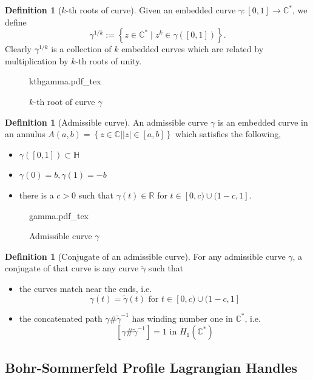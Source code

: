 \documentclass[11pt, oneside,dvipsnames]{amsart}
\newcommand{\incfig}[2]{
   
        \def\svgscale{#1}
    {#2.pdf_tex}
      
      
  
 }
\renewcommand{\to}{\rightarrow}
\newcommand{\sub}{\subset}
\newcommand{\inv}{^{-1}}
\newcommand{\wt}{\widetilde}
\renewcommand{\to}{\rightarrow}
\newcommand{\<}{\langle}
\renewcommand{\>}{\rangle}
\newcommand{\bC}{\mathbb{C}}
\newcommand{\bH}{\mathbb{H}}
\newcommand{\bR}{\mathbb{R}}
\renewcommand{\to}{\rightarrow}
\theoremstyle{definition}
\theoremstyle{definition}
\newtheorem{defn}[Theorem]{Definition}
\numberwithin{equation}{subsection}
\begin{document}
\begin{defn}[$k$-th roots of curve]
    Given an embedded curve $\gamma:[0,1] \to \bC^*$, we define $$\gamma^{1/k} := \left \{ z\in \bC^* \mid z^k \in \gamma([0,1]) \right\}. $$ Clearly $\gamma^{1/k}$ is a collection of $k$ embedded curves which are related by multiplication by $k$-th roots of unity. 
\end{defn}


\begin{figure}[ht]
    \centering
   \incfig{1}{kthgamma}
    \caption{$k$-th root of curve $\gamma$}
\end{figure}
\begin{defn}[Admissible curve]
    An admissible curve $\gamma$ is an embedded curve in an annulus $A(a,b) = \left \{ z \in \bC | |z|\in [a,b] \right \}$ which satisfies the following,
    \begin{itemize}
        \item $\gamma([0,1]) \sub \bH$
        \item $\gamma(0) = b, \gamma(1) = -b$
        \item there is a  $c > 0 $ such that  $\gamma(t) \in \bR$  for $t\in [0,c) \cup (1-c,1] .$
    \end{itemize}
    
\end{defn}


\begin{figure}[ht]
    \centering
   \incfig{1}{gamma}
    \caption{Admissible curve $\gamma$}
\end{figure}


\begin{defn}[Conjugate of an admissible curve]
For any admissible curve $\gamma$, a conjugate of that curve is any curve $\widetilde {\gamma} $ such that 
\begin{itemize}
    \item the curves match near the ends, i.e.  $$\gamma (t) = \wt \gamma (t) \text{ for  } t\in [0,c) \cup (1-c,1]$$
    \item the concatenated path $\gamma  \# {\wt \gamma}\inv $ has winding number one in $\bC^*$, i.e. $$[\gamma  \# {\wt \gamma}\inv]= 1   \text{ in } H_1(\bC^*) $$

    
\end{itemize}

    
\end{defn}

\subsection{Bohr-Sommerfeld Profile Lagrangian Handles} \label{bohrsomhandle}
\end{document}
